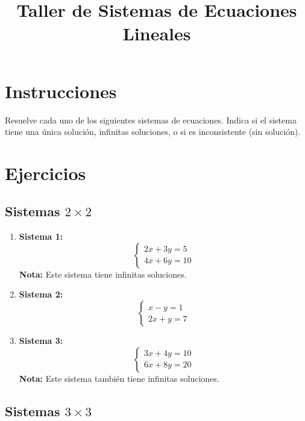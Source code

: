 \documentclass{article}
\title{Taller de Sistemas de Ecuaciones Lineales}
\author{}
\date{}
\begin{document}
\maketitle

\section*{Instrucciones}
Resuelve cada uno de los siguientes sistemas de ecuaciones. Indica si el sistema tiene una única solución, infinitas soluciones, o si es inconsistente (sin solución).

\section*{Ejercicios}

\subsection*{Sistemas \(2 \times 2\)}

\begin{enumerate}
    \item \textbf{Sistema 1:}
    \[
    \begin{cases}
      2x + 3y = 5 \\
      4x + 6y = 10
    \end{cases}
    \]
    \textbf{Nota:} Este sistema tiene infinitas soluciones.

    \item \textbf{Sistema 2:}
    \[
    \begin{cases}
      x - y = 1 \\
      2x + y = 7
    \end{cases}
    \]

    \item \textbf{Sistema 3:}
    \[
    \begin{cases}
      3x + 4y = 10 \\
      6x + 8y = 20
    \end{cases}
    \]
    \textbf{Nota:} Este sistema también tiene infinitas soluciones.
\end{enumerate}

\subsection*{Sistemas \(3 \times 3\)}
\end{document}
